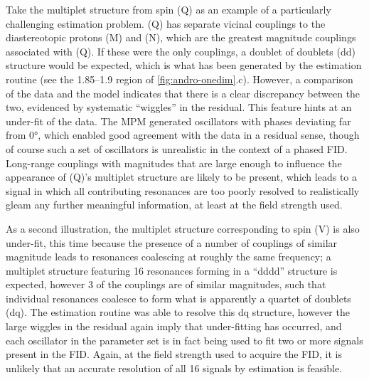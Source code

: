 Take the multiplet structure from spin (Q) as an example of a particularly
challenging estimation problem.
(Q) has separate vicinal couplings to the
diastereotopic protons (M) and (N), which are the greatest magnitude couplings
associated with (Q). If these were the only couplings, a doublet of doublets
(dd) structure would be expected, which is what has been generated by
the estimation routine (see the \SIrange{1.85}{1.9}{\partspermillion} region of
\cref{fig:andro-onedim}.c).
However, a comparison of the data and
the model indicates that there is a clear discrepancy between the two,
evidenced by systematic ``wiggles'' in the residual. This feature hints at an
under-fit of the data.
The \ac{MPM} generated oscillators with phases deviating far from \ang{0},
which enabled good agreement with the data in a residual sense, though of
course such a set of oscillators is unrealistic in the context of a phased
\ac{FID}.
Long-range couplings with magnitudes that are large enough to influence the
appearance of (Q)'s multiplet structure are likely to be present, which leads
to a signal in which all contributing resonances are too poorly resolved to
realistically gleam any further meaningful information, at least at the field
strength used.

As a second illustration, the multiplet structure corresponding to spin (V) is also
under-fit, this time because the presence of a number of couplings of similar
magnitude leads to resonances coalescing at roughly the same frequency; a
multiplet structure featuring 16 resonances forming in a ``dddd'' structure is
expected, however 3 of the couplings are of similar magnitudes, such that
individual resonances coalesce to form what is apparently a quartet of doublets (dq).
The estimation routine was able to resolve this dq structure,
however the large wiggles in the residual again imply that under-fitting has
occurred, and each oscillator in the parameter set is in fact being used to fit
two or more signals present in the \ac{FID}. Again, at the field strength used
to acquire the \ac{FID}, it is unlikely that an accurate resolution of all 16
signals by estimation is feasible.


